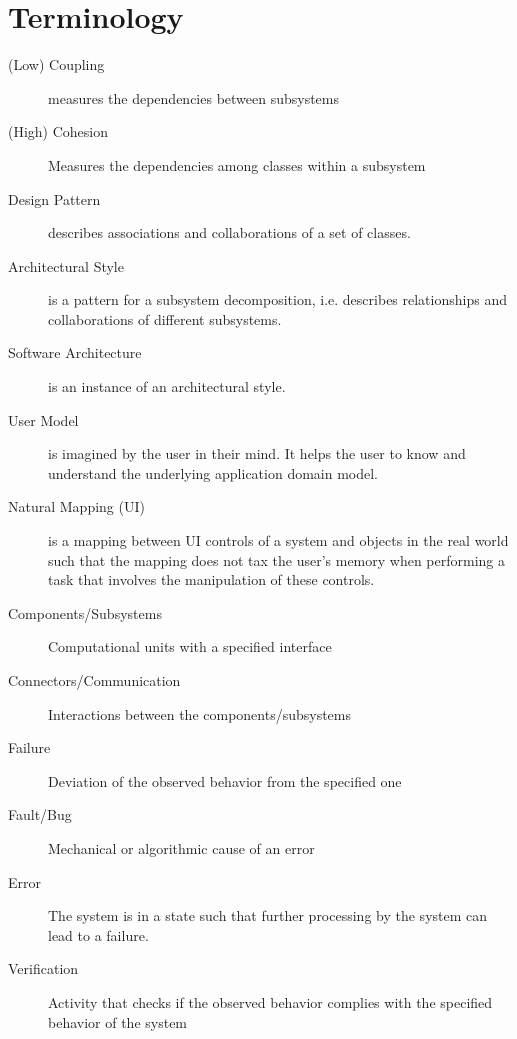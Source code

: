 
\section{Terminology}
\begin{description}
  \item[(Low) Coupling] measures the dependencies between subsystems

  \item[(High) Cohesion] Measures the dependencies among classes within a subsystem

  \item[Design Pattern] describes associations and collaborations of a set of classes.

  \item[Architectural Style] is a pattern for a subsystem decomposition, i.e. describes relationships and collaborations of different subsystems.

  \item[Software Architecture] is an instance of an architectural style.

  \item[User Model] is imagined by the user in their mind.
  It helps the user to know and understand the underlying application domain model.

  \item[Natural Mapping (UI)] is a mapping between UI controls of a system and objects in the real world such that the mapping does not tax the user's memory when performing a task that involves the manipulation of these controls.

  \item[Components/Subsystems] Computational units with a specified interface

  \item[Connectors/Communication] Interactions between the components/subsystems

  \item[Failure] Deviation of the observed behavior from the specified one

  \item[Fault/Bug] Mechanical or algorithmic cause of an error

  \item[Error] The system is in a state such that further processing by the system can lead to a failure.

  \item[Verification] Activity that checks if the observed behavior complies with the specified behavior of the system


\end{description}
